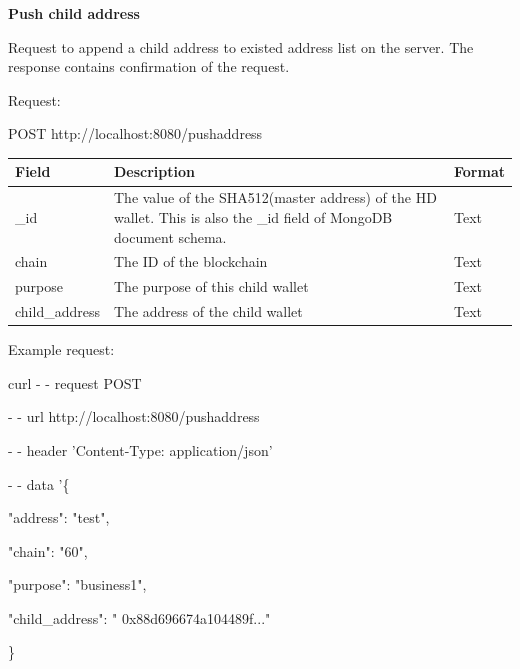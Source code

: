 \bigskip
{\textbf{Push child address}}
\bigskip

Request to append a child address to existed address list on the server. The response contains confirmation of the request.

Request:

\begin{framed}
    POST http://localhost:8080/pushaddress
\end{framed}

\begin{tabular}{ m{3cm}  m{9cm}  m{2.6cm} }
    \toprule
    Field & Description & Format                                            \\ 
    \midrule
    \_id & The value of the SHA512(master address) of the HD wallet. This is also the \_id field of MongoDB document schema.  & Text   \\ 
    chain   & The ID of the blockchain & Text    \\ 
    purpose   & The purpose of this child wallet & Text    \\ 
    child\_address   & The address of the child wallet & Text    \\ 
    \bottomrule
\end{tabular}
\bigskip

Example request:

\begin{framed}
\hspace*{13mm}    curl - - request POST \par
\hspace*{13mm}        - - url http://localhost:8080/pushaddress \par
\hspace*{13mm}        - - header 'Content-Type: application/json' \par
\hspace*{13mm}        - - data '\{ \par
\hspace*{27mm}                "address": "test",  \par
\hspace*{40mm}                "chain": "60", \par
\hspace*{40mm}                "purpose": "business1", \par
\hspace*{40mm}                "child\_address": " 0x88d696674a104489f..." \par
\hspace*{27mm}              \} \par
\end{framed}


